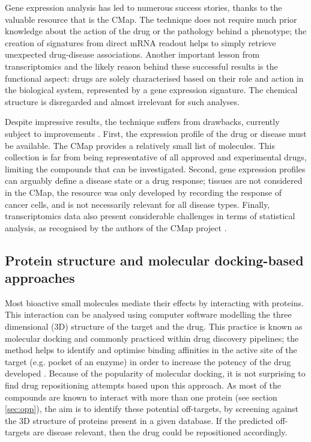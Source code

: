 Gene expression analysis has led to numerous success stories, thanks to the valuable resource that is the CMap. The technique does not require much prior knowledge about the action of the drug or the pathology behind a phenotype; the creation of signatures from direct mRNA readout helps to simply retrieve unexpected drug-disease associations. Another important lesson from transcriptomics and the likely reason behind these successful results is the functional aspect: drugs are solely characterised based on their role and action in the biological system, represented by a gene expression signature. The chemical structure is disregarded and almost irrelevant for such analyses.

Despite impressive results, the technique suffers from drawbacks, currently subject to improvements \citep{cmap}. First, the expression profile of the drug or disease must be available. The CMap provides a relatively small list of molecules. This collection is far from being representative of all approved and experimental drugs, limiting the compounds that can be investigated. Second, gene expression profiles can arguably define a disease state or a drug response; tissues are not considered in the CMap, the resource was only developed by recording the response of cancer cells, and is not necessarily relevant for all disease types. Finally, transcriptomics data also present considerable challenges in terms of statistical analysis, as recognised by the authors of the CMap project \citep{lamb2006connectivity}.


\subsection{Protein structure and molecular docking-based approaches}
Most bioactive small molecules mediate their effects by interacting with proteins. This interaction can be analysed using computer software modelling the three dimensional (3D) structure of the target and the drug. This practice is known as molecular docking and commonly practiced within drug discovery pipelines; the method helps to identify and optimise binding affinities in the active site of the target (e.g. pocket of an enzyme) in order to increase the potency of the drug developed \citep{haupt2011old}. Because of the popularity of molecular docking, it is not surprising to find drug repositioning attempts based upon this approach. As most of the compounds are known to interact with more than one protein (see section \ref{sec:opp}), the aim is to identify these potential off-targets, by screening against the 3D structure of proteins present in a given database. If the predicted off-targets are disease relevant, then the drug could be repositioned accordingly.

